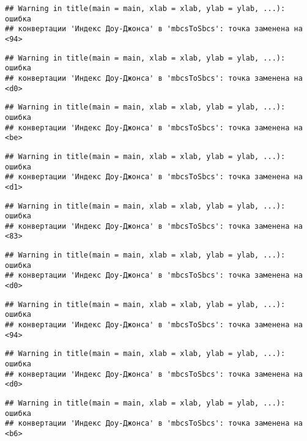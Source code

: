 \documentclass[
]{article}
\begin{document}
\begin{verbatim}
## Warning in title(main = main, xlab = xlab, ylab = ylab, ...): ошибка
## конвертации 'Индекс Доу-Джонса' в 'mbcsToSbcs': точка заменена на <94>
\end{verbatim}

\begin{verbatim}
## Warning in title(main = main, xlab = xlab, ylab = ylab, ...): ошибка
## конвертации 'Индекс Доу-Джонса' в 'mbcsToSbcs': точка заменена на <d0>
\end{verbatim}

\begin{verbatim}
## Warning in title(main = main, xlab = xlab, ylab = ylab, ...): ошибка
## конвертации 'Индекс Доу-Джонса' в 'mbcsToSbcs': точка заменена на <be>
\end{verbatim}

\begin{verbatim}
## Warning in title(main = main, xlab = xlab, ylab = ylab, ...): ошибка
## конвертации 'Индекс Доу-Джонса' в 'mbcsToSbcs': точка заменена на <d1>
\end{verbatim}

\begin{verbatim}
## Warning in title(main = main, xlab = xlab, ylab = ylab, ...): ошибка
## конвертации 'Индекс Доу-Джонса' в 'mbcsToSbcs': точка заменена на <83>
\end{verbatim}

\begin{verbatim}
## Warning in title(main = main, xlab = xlab, ylab = ylab, ...): ошибка
## конвертации 'Индекс Доу-Джонса' в 'mbcsToSbcs': точка заменена на <d0>
\end{verbatim}

\begin{verbatim}
## Warning in title(main = main, xlab = xlab, ylab = ylab, ...): ошибка
## конвертации 'Индекс Доу-Джонса' в 'mbcsToSbcs': точка заменена на <94>
\end{verbatim}

\begin{verbatim}
## Warning in title(main = main, xlab = xlab, ylab = ylab, ...): ошибка
## конвертации 'Индекс Доу-Джонса' в 'mbcsToSbcs': точка заменена на <d0>
\end{verbatim}

\begin{verbatim}
## Warning in title(main = main, xlab = xlab, ylab = ylab, ...): ошибка
## конвертации 'Индекс Доу-Джонса' в 'mbcsToSbcs': точка заменена на <b6>
\end{verbatim}
\end{document}
